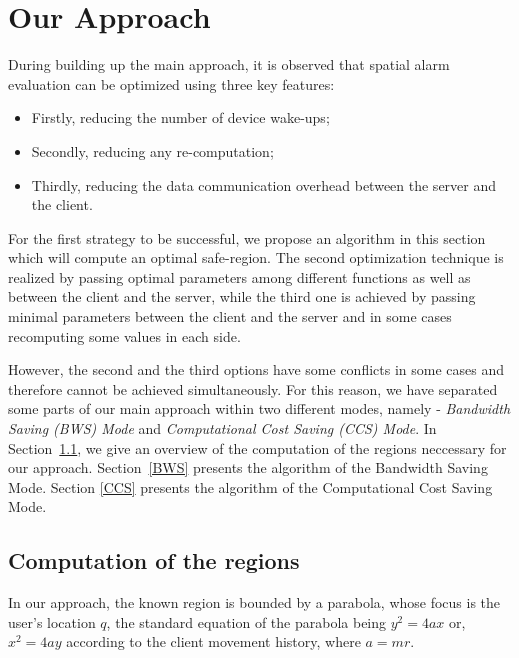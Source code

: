 \chapter{Our Approach}
\label{chap:ourapp}




During building up the main approach, it is observed that spatial alarm evaluation can be optimized using three key features: 
\begin{itemize}
\setlength\itemsep{0em}
\item Firstly, reducing the number of device wake-ups;
\item Secondly, reducing any re-computation;
\item Thirdly, reducing the data communication overhead between the server and the client.
\end{itemize}

For the first strategy to be successful, we propose an algorithm in this section which will compute an optimal safe-region. The second optimization technique is realized by passing optimal parameters among different functions as well as between the client and the server, while the third one is achieved by passing minimal parameters between the client and the server and in some cases recomputing some values in each side.

However, the second and the third options have some conflicts in some cases and therefore cannot be achieved simultaneously. For this reason, we have separated some parts of our main approach within two different modes, namely - \textit{Bandwidth Saving (BWS) Mode} and \textit{Computational Cost Saving (CCS) Mode}.
\vspace{5pt}
In Section~\ref{Comp_reg}, we give an overview of the computation of the regions neccessary for our approach. Section~\ref{BWS} presents the algorithm of the Bandwidth Saving Mode. Section \ref{CCS} presents the algorithm of the Computational Cost Saving Mode.

\section{Computation of the regions}
\label{Comp_reg}
In our approach, the known region is bounded by a parabola, whose focus is the user's location $q$, the standard equation of the parabola being $y^2=4ax$ or, $x^2=4ay$ according to the client movement history, where $ a=mr$.\\

